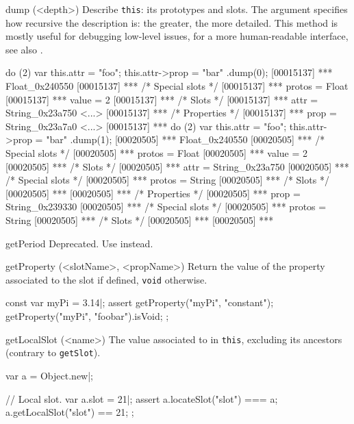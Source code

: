 \begin{urbiscriptapi}
\item[dump](<depth>)%
  Describe \lstinline|this|: its prototypes and slots.  The argument
   specifies how recursive the description is: the greater,
  the more detailed.  This method is mostly useful for debugging
  low-level issues, for a more human-readable interface, see also
  .
\begin{urbiscript}
do (2) { var this.attr = "foo"; this.attr->prop = "bar" }.dump(0);
[00015137] *** Float_0x240550 {
[00015137] ***   /* Special slots */
[00015137] ***   protos = Float
[00015137] ***   value = 2
[00015137] ***   /* Slots */
[00015137] ***   attr = String_0x23a750 <...>
[00015137] ***     /* Properties */
[00015137] ***     prop = String_0x23a7a0 <...>
[00015137] ***   }
do (2) { var this.attr = "foo"; this.attr->prop = "bar" }.dump(1);
[00020505] *** Float_0x240550 {
[00020505] ***   /* Special slots */
[00020505] ***   protos = Float
[00020505] ***   value = 2
[00020505] ***   /* Slots */
[00020505] ***   attr = String_0x23a750 {
[00020505] ***     /* Special slots */
[00020505] ***     protos = String
[00020505] ***     /* Slots */
[00020505] ***     }
[00020505] ***     /* Properties */
[00020505] ***     prop = String_0x239330 {
[00020505] ***       /* Special slots */
[00020505] ***       protos = String
[00020505] ***       /* Slots */
[00020505] ***       }
[00020505] ***   }
\end{urbiscript}

\item[getPeriod]
  Deprecated.  Use  instead.

\item[getProperty](<slotName>, <propName>)%
  Return the value of the  property associated to the
  slot  if defined, \lstinline|void| otherwise.
\begin{urbiscript}
const var myPi = 3.14|;
assert
{
  getProperty("myPi", "constant");
  getProperty("myPi", "foobar").isVoid;
};
\end{urbiscript}

\item[getLocalSlot](<name>)%
  The value associated to  in \lstinline|this|, excluding
  its ancestors (contrary to \lstinline|getSlot|).
\begin{urbiscript}
var a = Object.new|;

// Local slot.
var a.slot = 21|;
assert
{
  a.locateSlot("slot") === a;
  a.getLocalSlot("slot") == 21;
};


\end{urbiscript}
\end{urbiscriptapi}
